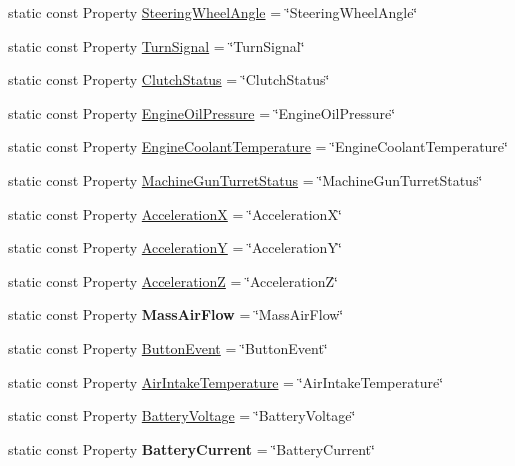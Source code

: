 \begin{DoxyCompactItemize}
\item 
static const Property \hyperlink{classVehicleProperty_aba4832663e4f850acbcf09c7cfbc6959}{Steering\-Wheel\-Angle} = \char`\"{}Steering\-Wheel\-Angle\char`\"{}
\item 
static const Property \hyperlink{classVehicleProperty_a0aae609c370a46a92dc52a31d2cc0310}{Turn\-Signal} = \char`\"{}Turn\-Signal\char`\"{}
\item 
static const Property \hyperlink{classVehicleProperty_acdca2ca718fd392c7ad9b8adc817baec}{Clutch\-Status} = \char`\"{}Clutch\-Status\char`\"{}
\item 
static const Property \hyperlink{classVehicleProperty_ab7fad273c7149dbd338f53f2536aca26}{Engine\-Oil\-Pressure} = \char`\"{}Engine\-Oil\-Pressure\char`\"{}
\item 
static const Property \hyperlink{classVehicleProperty_ae4f240ad9cecbbb9d0cb3a615865b60a}{Engine\-Coolant\-Temperature} = \char`\"{}Engine\-Coolant\-Temperature\char`\"{}
\item 
static const Property \hyperlink{classVehicleProperty_a8b9faaa1094c2d162ed171a3063b7ffc}{Machine\-Gun\-Turret\-Status} = \char`\"{}Machine\-Gun\-Turret\-Status\char`\"{}
\item 
static const Property \hyperlink{classVehicleProperty_a94eac12d319850190e9ece93690517f7}{Acceleration\-X} = \char`\"{}Acceleration\-X\char`\"{}
\item 
static const Property \hyperlink{classVehicleProperty_af56803eeb7710aeae2954f4cd9b66cf6}{Acceleration\-Y} = \char`\"{}Acceleration\-Y\char`\"{}
\item 
static const Property \hyperlink{classVehicleProperty_a1ce0b3be3a09d5a96741890d0d67496f}{Acceleration\-Z} = \char`\"{}Acceleration\-Z\char`\"{}
\item 
\hypertarget{classVehicleProperty_aabc6b6b50b8a31bfe197cbd3ae0827a1}{static const Property {\bfseries Mass\-Air\-Flow} = \char`\"{}Mass\-Air\-Flow\char`\"{}}\label{classVehicleProperty_aabc6b6b50b8a31bfe197cbd3ae0827a1}

\item 
static const Property \hyperlink{classVehicleProperty_ab9fa252d209fbd2eb014c4d934d3d615}{Button\-Event} = \char`\"{}Button\-Event\char`\"{}
\item 
static const Property \hyperlink{classVehicleProperty_af4cbbae11228729335c50aa2d1fa2e28}{Air\-Intake\-Temperature} = \char`\"{}Air\-Intake\-Temperature\char`\"{}
\item 
static const Property \hyperlink{classVehicleProperty_a43a70a277b955ae35a9ba795d2052591}{Battery\-Voltage} = \char`\"{}Battery\-Voltage\char`\"{}
\item 
\hypertarget{classVehicleProperty_a3447a00e8ca09d12b208bc7c210a61b8}{static const Property {\bfseries Battery\-Current} = \char`\"{}Battery\-Current\char`\"{}}\label{classVehicleProperty_a3447a00e8ca09d12b208bc7c210a61b8}


\end{DoxyCompactItemize}

